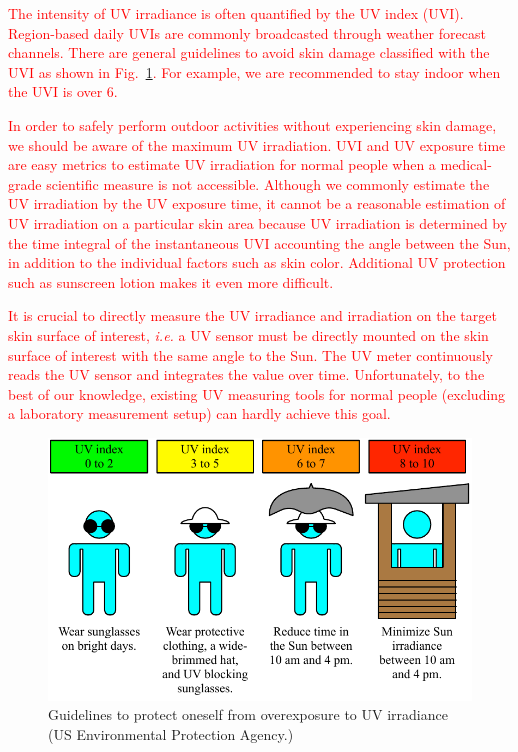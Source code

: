 \documentclass[journal]{IEEEtran}
\begin{document}
\textcolor{red}{The intensity of UV irradiance is often quantified by the UV index (UVI). Region-based daily UVIs are commonly broadcasted through weather forecast channels. There are general guidelines to avoid skin damage classified with the UVI as shown in Fig.~\ref{fig:guidelines}. For example, we are recommended to stay indoor when the UVI  is over 6.} 

\textcolor{red}{In order to safely perform outdoor activities without experiencing skin damage, we should be aware of  the maximum UV irradiation. UVI and UV exposure time are easy metrics to estimate UV irradiation for normal people when a medical-grade scientific measure is not accessible. Although we commonly estimate the UV irradiation by the UV exposure time, it cannot be a reasonable estimation of UV irradiation on a particular skin area because UV irradiation is determined by the time integral of the instantaneous UVI accounting the angle between the Sun, in addition to the individual factors such as skin color. Additional UV protection such as sunscreen lotion makes it even more difficult.} 

\textcolor{red}{It is crucial to directly measure the UV irradiance and irradiation on the target skin surface of interest, \textit{i.e.} a UV sensor must be directly mounted on the skin surface of interest with the same angle to the Sun. The UV meter continuously reads the UV sensor and integrates the value over time. Unfortunately, to the best of our knowledge, existing UV measuring tools for normal people (excluding a laboratory measurement setup) can hardly achieve this goal.}

\begin{figure}
\centering
\includegraphics[width=1.0\hsize]{Figures/UVI_guideline.pdf}
\caption{Guidelines to protect oneself from overexposure to UV irradiance (US Environmental Protection Agency.)}
\label{fig:guidelines}
\end{figure}
\end{document}

